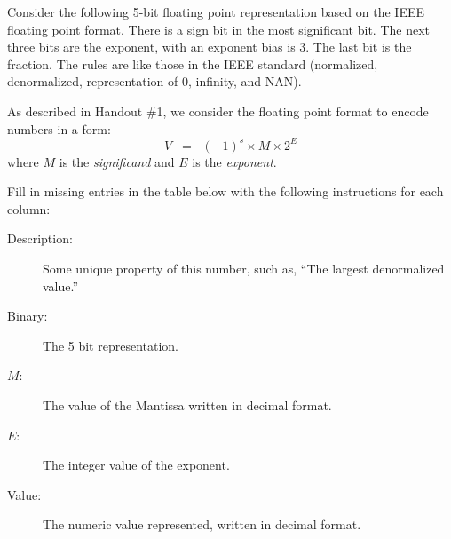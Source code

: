 \begin{problem}{12}
Consider the following 5-bit floating point representation based on the
IEEE floating point format.
There is a sign bit in the most significant bit.
The next three bits are the exponent, with an exponent bias is 3.
The last bit is the fraction.
The rules are like those in the IEEE standard (normalized,
denormalized, representation of 0, infinity, and NAN).

As described in Handout \#1, we consider the floating point format to
encode numbers in a form:
\begin{displaymath}
V \;\;=\;\; (-1)^s \times M \times 2^E
\end{displaymath}
where $M$ is the {\em significand} and $E$ is the {\em exponent}.

Fill in missing entries in the table below 
with the following instructions for each column:
\begin{description}
\item[Description:] Some unique property of this number, such as, ``The largest denormalized value.''
\item[Binary:]
The 5 bit representation.
\item[$M$:] The value of the Mantissa written in decimal format.
\item[$E$:]
The integer value of the exponent.
\item[Value:] 
The numeric value represented, written in decimal format.
\end{description}


\end{problem}
